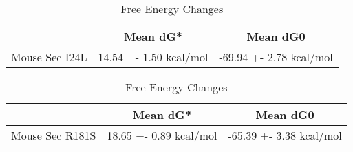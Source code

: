                                                     
                                                    \begin{table}[ht]
                                                      \centering
                                                      \begin{tabular}{|c|c|c|}
                                                      \hline
                                                        & Mean dG* & Mean dG0 \\
                                                      \hline
                                                      Mouse Sec I24L & 14.54 +- 1.50 kcal/mol & -69.94 +- 2.78 kcal/mol \\
                                                      \hline
                                                      \end{tabular}
                                                      \caption{Free Energy Changes}
                                                      \end{table}

            
                                                            \begin{table}[ht]
                                                              \centering
                                                              \begin{tabular}{|c|c|c|}
                                                              \hline
                                                                & Mean dG* & Mean dG0 \\
                                                              \hline
                                                              Mouse Sec R181S & 18.65 +- 0.89 kcal/mol & -65.39 +- 3.38 kcal/mol \\
                                                              \hline
                                                              \end{tabular}
                                                              \caption{Free Energy Changes}
                                                              \end{table}

